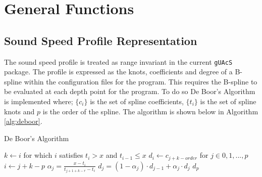 \documentclass{article}
\begin{document}
\section{General Functions}
\subsection{Sound Speed Profile Representation}
The sound speed profile is treated as range invariant in the current \texttt{gUAcS} package. The profile is expressed as the knots, coefficients and degree of a B-spline within the configuration files for the program. This requires the B-spline to be evaluated at each depth point for the program. To do so De Boor's Algorithm is implemented where; $\{c_{i}\}$ is the set of spline coefficients, $\{t_{i}\}$ is the set of spline knots and $p$ is the order of the spline. The algorithm is shown below in Algorithm \ref{alg:deboor}.
\begin{algorithm}[H]
	\label{alg:deboor}
	\caption{De Boor's Algorithm}
	\begin{algorithmic}
		\State $k\gets i$ for which $i$ satisfies $t_{i} > x$ and $t_{i-1} \leq x$
		\State $d_i\gets c_{j + k -order}$ for $j\in{0,1,...,p}$
		\State $i\gets j + k - p$
		\State $\alpha_j = \frac{x - t_i}{t_{j + 1 + k - r} - t_{i}}$
		\State $d_j = (1 - \alpha_j)\cdot d_{j-1} + \alpha_j\cdot d_{j}$
		\EndFor
		\EndFor
		\Return $d_{p}$
	\end{algorithmic}
\end{algorithm}


\nocite{*}
\printbibliography
\end{document}
